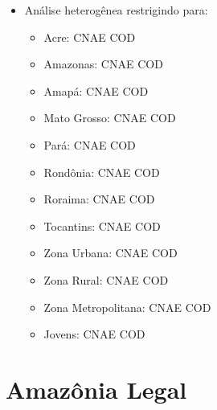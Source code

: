 \documentclass[8pt]{beamer}
\begin{document}
\begin{frame}[label=indice_principal]{}
\begin{itemize}
\item{Análise heterogênea restrigindo para:
	\begin{itemize}
	\item{Acre: CNAE	\hyperlink{amzaccnae2dig}{} COD 	\hyperlink{amzaccod2dig}{}}
	\item{Amazonas: CNAE	\hyperlink{amzamcnae2dig}{} COD 	\hyperlink{amzamcod2dig}{}}
	\item{Amapá: CNAE	\hyperlink{amzapcnae2dig}{} COD 	\hyperlink{amzapcod2dig}{}}
	\item{Mato Grosso: CNAE	\hyperlink{amzmtcnae2dig}{} COD 	\hyperlink{amzmtcod2dig}{}}
	\item{Pará: CNAE	\hyperlink{amzpacnae2dig}{} COD 	\hyperlink{amzpacod2dig}{}}
	\item{Rondônia: CNAE	\hyperlink{amzrocnae2dig}{} COD 	\hyperlink{amzrocod2dig}{}}
	\item{Roraima: CNAE	\hyperlink{amzrrcnae2dig}{} COD 	\hyperlink{amzrrcod2dig}{}}
	\item{Tocantins: CNAE	\hyperlink{amztocnae2dig}{} COD 	\hyperlink{amztocod2dig}{}}
	\item{Zona Urbana: CNAE	\hyperlink{amzurbanacnae2dig}{} COD 	\hyperlink{amzurbanacod2dig}{}}
	\item{Zona Rural: CNAE	\hyperlink{amzruralcnae2dig}{} COD 	\hyperlink{amzruralcod2dig}{}}
	\item{Zona Metropolitana: CNAE	\hyperlink{amzmetropolitanacnae2dig}{} COD 	\hyperlink{amzmetropolitanacod2dig}{}}
	\item{Jovens: CNAE	\hyperlink{amzjovemcnae2dig}{} COD 	\hyperlink{amzjovemcod2dig}{}}
	\vspace{1mm}
	\end{itemize}
}

\end{itemize}

\end{frame}


\section{Amazônia Legal}
\end{document}
